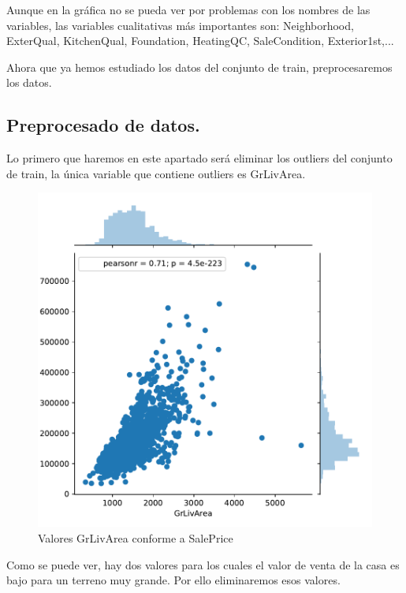 	Aunque en la gráfica no se pueda ver por problemas con los nombres de las variables, las variables cualitativas más importantes son: Neighborhood, ExterQual, KitchenQual, Foundation, HeatingQC, SaleCondition, Exterior1st,...
	
	\vspace{0.06in}
	Ahora que ya hemos estudiado los datos del conjunto de train, preprocesaremos los datos.
	
	\subsection{Preprocesado de datos.}
	Lo primero que haremos en este apartado será eliminar los outliers del conjunto de train, la única variable que contiene outliers es GrLivArea.
	
	\begin{figure}[H]
		\centering
		\includegraphics[scale=0.7]{imag/GrLivArea.pdf}
		\caption{Valores GrLivArea conforme a SalePrice}
		\label{fig:outliers_grlivarea}
	\end{figure}

	\vspace{0.06in}
	Como se puede ver, hay dos valores para los cuales el valor de venta de la casa es bajo para un terreno muy grande. Por ello eliminaremos esos valores.
	
